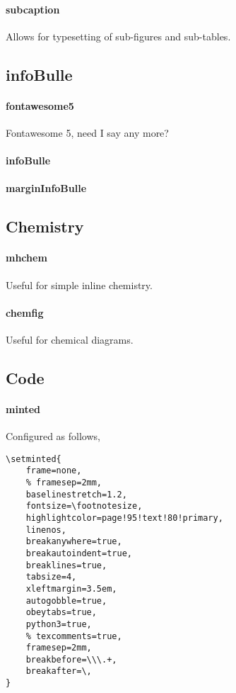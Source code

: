 \documentclass[solid,math,chem,code,plot,gloss]{bmc}
\begin{document}
\paragraph{\ttfamily subcaption}\label{par:subcaption}
Allows for typesetting of sub-figures and sub-tables.

\subsection{infoBulle}

\paragraph{\ttfamily fontawesome5}\label{par:fontawesome5}
Fontawesome 5, need I say any more?
\paragraph{\ttfamily infoBulle}\label{par:infoBulle}
\paragraph{\ttfamily marginInfoBulle}\label{par:marginInfoBulle}

\subsection{Chemistry}

\paragraph{\ttfamily mhchem}\label{par:mhchem}
Useful for simple inline chemistry.
\paragraph{\ttfamily chemfig}\label{par:chemfig}
Useful for chemical diagrams.

\subsection{Code}

\paragraph{\ttfamily minted}\label{par:minted}
Configured as follows,
\begin{verbatim}
\setminted{
    frame=none,
    % framesep=2mm,
    baselinestretch=1.2,
    fontsize=\footnotesize,
    highlightcolor=page!95!text!80!primary,
    linenos,
    breakanywhere=true,
    breakautoindent=true,
    breaklines=true,
    tabsize=4,
    xleftmargin=3.5em,
    autogobble=true,
    obeytabs=true,
    python3=true,
    % texcomments=true,
    framesep=2mm,
    breakbefore=\\\.+,
    breakafter=\,
}
\end{verbatim}
\end{document}
